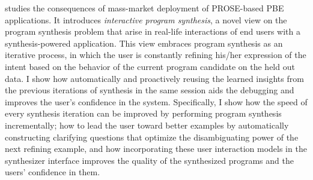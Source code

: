  studies the consequences of mass-market deployment of PROSE-based PBE applications.
It introduces \emph{interactive program synthesis}, a novel view on the program synthesis problem that arise in
real-life interactions of end users with a synthesis-powered application.
This view embraces program synthesis as an iterative process, in which the user is constantly refining his/her
expression of the intent based on the behavior of the current program candidate on the held out data.
I show how automatically and proactively reusing the learned insights from the previous iterations of synthesis in the
same session aids the debugging and improves the user's confidence in the system.
Specifically, I show how the speed of every synthesis iteration can be improved by performing program synthesis
incrementally; how to lead the user toward better examples by automatically constructing clarifying questions that
optimize the disambiguating power of the next refining example, and how incorporating these user interaction models in
the synthesizer interface improves the quality of the synthesized programs and the users' confidence in them.
